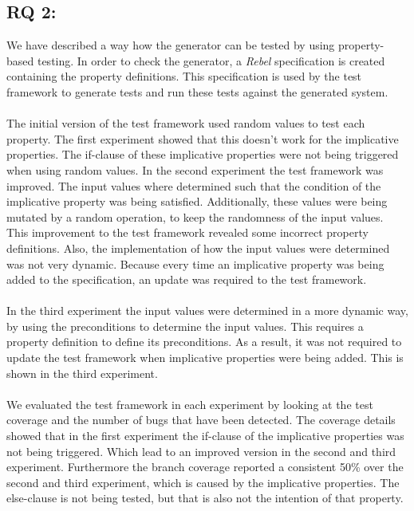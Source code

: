 \subsection*{RQ 2: \rqTwo{}}
We have described a way how the generator can be tested by using property-based
testing. In order to check the generator, a \textit{Rebel} specification is
created containing the property definitions. This specification is used by
the test framework to generate tests and run these tests against the generated
system.\\
\\
The initial version of the test framework used random values to test each property. The first experiment showed that this doesn't work for the implicative properties. The if-clause of these implicative properties were not being triggered when using random values. In the second experiment the test framework was improved. The input values where determined such that the condition of the implicative property was being satisfied. Additionally, these values were being mutated by a random operation, to keep the randomness of the input values. This improvement to the test framework revealed some incorrect property definitions. Also, the implementation of how the input values were determined was not very dynamic. Because every time an implicative property was being added to the specification, an update was required to the test framework.\\
\\
In the third experiment the input values were determined in a more dynamic way, by using the preconditions to determine the input values. This requires a property definition to define its preconditions. As a result, it was not required to update the test framework when implicative properties were being added. This is shown in the third experiment.\\
\\
We evaluated the test framework in each experiment by looking at the test coverage and the number of bugs that have been detected. The coverage details showed that in the first experiment the if-clause of the implicative properties was not being triggered. Which lead to an improved version in the second and third experiment. Furthermore the branch coverage reported a consistent 50\% over the second and third experiment, which is caused by the implicative properties. The else-clause is not being tested, but that is also not the intention of that property.\\
